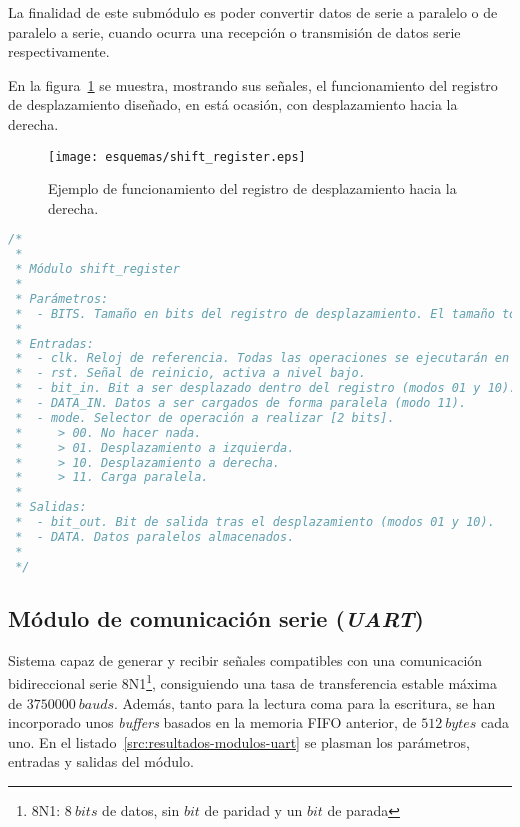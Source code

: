 La finalidad de este submódulo es poder convertir datos de serie a paralelo o de paralelo a serie, cuando ocurra una recepción o transmisión de datos serie respectivamente.

En la figura~\ref{fig:shift_esquema} se muestra, mostrando sus señales, el funcionamiento del registro de desplazamiento diseñado, en está ocasión, con desplazamiento hacia la derecha.

\begin{figure}[htb]
    \centering
    \texttt{[image: esquemas/shift\_register.eps]}
    \caption{Ejemplo de funcionamiento del registro de desplazamiento hacia la derecha.}
    \label{fig:shift_esquema}
\end{figure}

\begin{lstlisting}[language=Verilog,
    caption={Parámetros, entradas y salidas del módulo shift\_register.},
    label=src:resultados-modulos-shift]
/*
 *
 * Módulo shift_register
 *
 * Parámetros:
 *  - BITS. Tamaño en bits del registro de desplazamiento. El tamaño total será de BITS + 1 (bit de salida).
 *
 * Entradas:
 *  - clk. Reloj de referencia. Todas las operaciones se ejecutarán en el flanqueo de subida.
 *  - rst. Señal de reinicio, activa a nivel bajo.
 *  - bit_in. Bit a ser desplazado dentro del registro (modos 01 y 10).
 *  - DATA_IN. Datos a ser cargados de forma paralela (modo 11).
 *  - mode. Selector de operación a realizar [2 bits].
 *     > 00. No hacer nada.
 *     > 01. Desplazamiento a izquierda.
 *     > 10. Desplazamiento a derecha.
 *     > 11. Carga paralela.
 *
 * Salidas:
 *  - bit_out. Bit de salida tras el desplazamiento (modos 01 y 10).
 *  - DATA. Datos paralelos almacenados.
 *
 */
\end{lstlisting}


\subsection{Módulo de comunicación serie (\emph{UART})}
Sistema capaz de generar y recibir señales compatibles con una comunicación bidireccional serie 8N1\footnote{8N1: $8~bits$ de datos, sin $bit$ de paridad y un $bit$ de parada}, consiguiendo una tasa de transferencia estable máxima de $3750000~bauds$. Además, tanto para la lectura coma para la escritura, se han incorporado unos \emph{buffers} basados en la memoria FIFO anterior, de $512~bytes$ cada uno. En el listado~\ref{src:resultados-modulos-uart} se plasman los parámetros, entradas y salidas del módulo.

